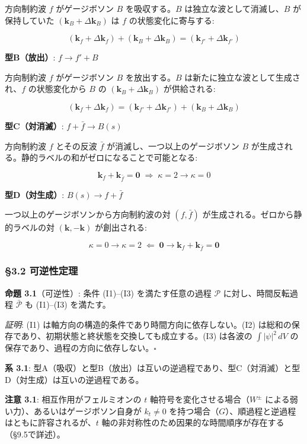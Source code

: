\documentclass[
  a4paper,11pt]{ltjsarticle}
\theoremstyle{definition}
\theoremstyle{remark}
\begin{document}
方向制約波 \(f\) がゲージボソン \(B\) を吸収する。\(B\)
は独立な波として消滅し、\(B\) が保持していた
\((\mathbf{k}_B + \Delta\mathbf{k}_B)\) は \(f\) の状態変化に寄与する:

\[(\mathbf{k}_f + \Delta\mathbf{k}_f) + (\mathbf{k}_B + \Delta\mathbf{k}_B) = (\mathbf{k}_{f'} + \Delta\mathbf{k}_{f'})\]

\textbf{型B（放出）}: \(f \longrightarrow f' + B\)

方向制約波 \(f\) がゲージボソン \(B\) を放出する。\(B\)
は新たに独立な波として生成され、\(f\) の状態変化から \(B\) の
\((\mathbf{k}_B + \Delta\mathbf{k}_B)\) が供給される:

\[(\mathbf{k}_f + \Delta\mathbf{k}_f) = (\mathbf{k}_{f'} + \Delta\mathbf{k}_{f'}) + (\mathbf{k}_B + \Delta\mathbf{k}_B)\]

\textbf{型C（対消滅）}: \(f + \bar{f} \longrightarrow B(s)\)

方向制約波 \(f\) とその反波 \(\bar{f}\) が消滅し、一つ以上のゲージボソン
\(B\) が生成される。静的ラベルの和がゼロになることで可能となる:

\[\mathbf{k}_f + \mathbf{k}_{\bar{f}} = \mathbf{0} \;\Longrightarrow\; \kappa = 2 \to \kappa = 0\]

\textbf{型D（対生成）}: \(B(s) \longrightarrow f + \bar{f}\)

一つ以上のゲージボソンから方向制約波の対 \((f, \bar{f})\)
が生成される。ゼロから静的ラベルの対 \((\mathbf{k}, -\mathbf{k})\)
が創出される:

\[\kappa = 0 \to \kappa = 2 \;\Longleftarrow\; \mathbf{0} \to \mathbf{k}_f + \mathbf{k}_{\bar{f}} = \mathbf{0}\]

\subsubsection{§3.2 可逆性定理}\label{ux53efux9006ux6027ux5b9aux7406}

\textbf{命題 3.1}（可逆性）: 条件 (I1)--(I3) を満たす任意の過程
\(\mathcal{P}\) に対し、時間反転過程 \(\bar{\mathcal{P}}\) も (I1)--(I3)
を満たす。

\emph{証明}: (I1) は軸方向の構造的条件であり時間方向に依存しない。(I2)
は総和の保存であり、初期状態と終状態を交換しても成立する。(I3) は各波の
\(\int |\psi|^2 \, dV\)
の保存であり、過程の方向に依存しない。\(\square\)

\textbf{系 3.1}:
型A（吸収）と型B（放出）は互いの逆過程であり、型C（対消滅）と型D（対生成）は互いの逆過程である。

\textbf{注意 3.1}: 相互作用がフェルミオンの \(t\)
軸符号を変化させる場合（\(W^{\pm}\)
による弱い力）、あるいはゲージボソン自身が \(k_t \neq 0\)
を持つ場合（\(G\)）、順過程と逆過程はともに許容されるが、\(t\)
軸の非対称性のため因果的な時間順序が存在する（§9.5で詳述）。
\end{document}
